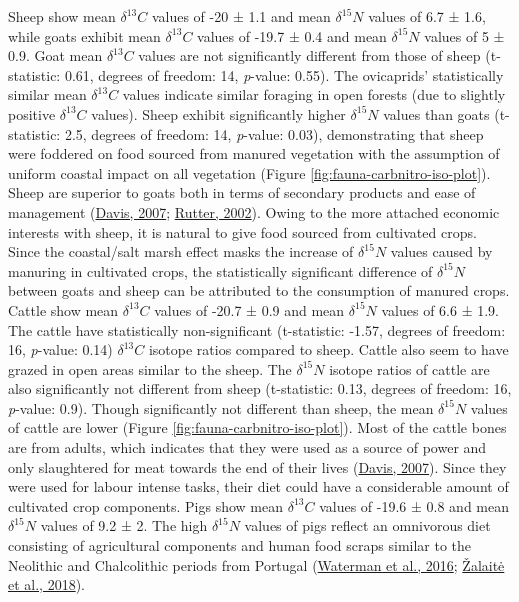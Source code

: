 \documentclass[preprint, 3p, authoryear]{elsarticle} %
\begin{document}
Sheep show mean \(\delta ^{13}C\) values of -20 ± 1.1\text{\textperthousand} and mean \(\delta ^{15}N\) values of 6.7 ± 1.6\text{\textperthousand}, while goats exhibit mean \(\delta ^{13}C\) values of -19.7 ± 0.4\text{\textperthousand} and mean \(\delta ^{15}N\) values of 5 ± 0.9\text{\textperthousand}. Goat mean \(\delta ^{13}C\) values are not significantly different from those of sheep (t-statistic: 0.61, degrees of freedom: 14, \emph{p}-value: 0.55). The ovicaprids' statistically similar mean \(\delta ^{13}C\) values indicate similar foraging in open forests (due to slightly positive \(\delta ^{13}C\) values). Sheep exhibit significantly higher \(\delta ^{15}N\) values than goats (t-statistic: 2.5, degrees of freedom: 14, \emph{p}-value: 0.03), demonstrating that sheep were foddered on food sourced from manured vegetation with the assumption of uniform coastal impact on all vegetation (Figure \ref{fig:fauna-carbnitro-iso-plot}). Sheep are superior to goats both in terms of secondary products and ease of management (\protect\hyperlink{ref-davis07}{Davis, 2007}; \protect\hyperlink{ref-rutter02}{Rutter, 2002}). Owing to the more attached economic interests with sheep, it is natural to give food sourced from cultivated crops. Since the coastal/salt marsh effect masks the increase of \(\delta ^{15}N\) values caused by manuring in cultivated crops, the statistically significant difference of \(\delta ^{15}N\) between goats and sheep can be attributed to the consumption of manured crops. Cattle show mean \(\delta ^{13}C\) values of -20.7 ± 0.9\text{\textperthousand} and mean \(\delta ^{15}N\) values of 6.6 ± 1.9\text{\textperthousand}. The cattle have statistically non-significant (t-statistic: -1.57, degrees of freedom: 16, \emph{p}-value: 0.14) \(\delta ^{13}C\) isotope ratios compared to sheep. Cattle also seem to have grazed in open areas similar to the sheep. The \(\delta ^{15}N\) isotope ratios of cattle are also significantly not different from sheep (t-statistic: 0.13, degrees of freedom: 16, \emph{p}-value: 0.9). Though significantly not different than sheep, the mean \(\delta ^{15}N\) values of cattle are lower (Figure \ref{fig:fauna-carbnitro-iso-plot}). Most of the cattle bones are from adults, which indicates that they were used as a source of power and only slaughtered for meat towards the end of their lives (\protect\hyperlink{ref-davis07}{Davis, 2007}). Since they were used for labour intense tasks, their diet could have a considerable amount of cultivated crop components. Pigs show mean \(\delta ^{13}C\) values of -19.6 ± 0.8\text{\textperthousand} and mean \(\delta ^{15}N\) values of 9.2 ± 2\text{\textperthousand}. The high \(\delta ^{15}N\) values of pigs reflect an omnivorous diet consisting of agricultural components and human food scraps similar to the Neolithic and Chalcolithic periods from Portugal (\protect\hyperlink{ref-waterman_etal16}{Waterman et al., 2016}; \protect\hyperlink{ref-zalaite_etal18}{Žalaitė et al., 2018}).
\end{document}
